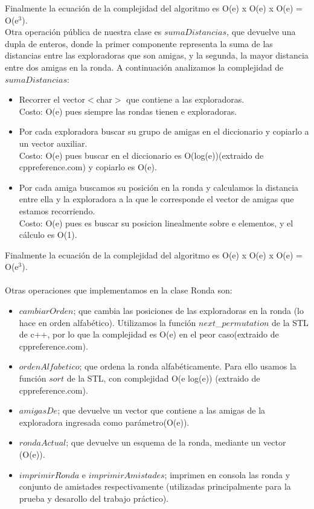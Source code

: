 Finalmente la ecuación de la complejidad del algoritmo es O(e) x O(e) x O(e) = O(e$^3$). \\
Otra operación pública de nuestra clase es $sumaDistancias$, que devuelve una dupla de enteros, donde la primer componente 
representa la suma de las distancias entre las exploradoras que son amigas, y la segunda, la mayor distancia entre dos amigas en 
la ronda. A continuación analizamos la complejidad de $sumaDistancias$: 
\begin{itemize}
\item Recorrer el vector$<$char$>$ que contiene a las exploradoras. \\
Costo: O(e) pues siempre las rondas tienen e exploradoras.
\item Por cada exploradora buscar su grupo de amigas en el diccionario y copiarlo a un vector auxiliar. \\
Costo: O(e) pues buscar en el diccionario es O(log(e))(extraido de cppreference.com) y copiarlo es O(e).
\item Por cada amiga buscamos su posición en la ronda y calculamos la distancia entre ella y la exploradora a la que le corresponde el vector de amigas que estamos recorriendo. \\
Costo: O(e) pues es buscar su posicion linealmente sobre e elementos, y el cálculo es O(1).
\end{itemize}
Finalmente la ecuación de la complejidad del algoritmo es O(e) x O(e) x O(e) = O(e$^3$). \\
\\
Otras operaciones que implementamos en la clase Ronda son: 
\begin{itemize}
\item $cambiarOrden$; que cambia las posiciones de las exploradoras en la ronda (lo hace en orden alfabético). Utilizamos la función 
$next$\_$permutation$ de la STL de c++, por lo que la complejidad es O(e) en el peor caso(extraido de cppreference.com). 
\item $ordenAlfabetico$; que ordena la ronda alfabéticamente. Para ello usamos la función $sort$ de la STL, con complejidad
O(e log(e)) (extraido de cppreference.com).
\item $amigasDe$; que devuelve un vector que contiene a las amigas de la exploradora ingresada como parámetro(O(e)).
\item $rondaActual$; que devuelve un esquema de la ronda, mediante un vector (O(e)).
\item $imprimirRonda$ e $imprimirAmistades$; imprimen en consola las ronda y conjunto de amistades respectivamente (utilizadas
principalmente para la prueba y desarollo del trabajo práctico).  
\end{itemize}

